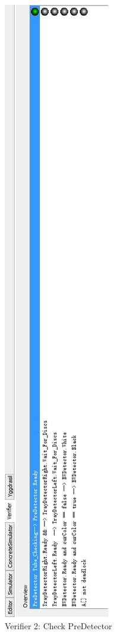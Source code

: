 \documentclass[a4paper,oneside,11pt]{report}
\begin{document}
\begin{figure}
\centering
\includegraphics[height=0.75\textheight]{images/verify2.jpg}
\caption{Verifier 2: Check PreDetector}
\label{fig:verify2}
\end{figure}
\end{document}
